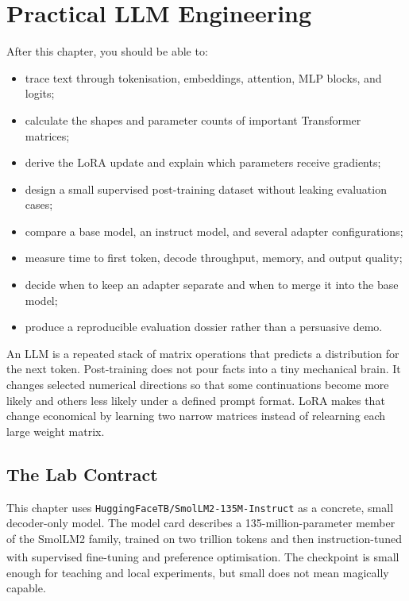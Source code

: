 \chapter{Practical LLM Engineering}
\label{ch:practical-llm-engineering}

\begin{learningobjectives}
After this chapter, you should be able to:
\begin{itemize}
    \item trace text through tokenisation, embeddings, attention, MLP blocks,
          and logits;
    \item calculate the shapes and parameter counts of important Transformer
          matrices;
    \item derive the LoRA update and explain which parameters receive gradients;
    \item design a small supervised post-training dataset without leaking
          evaluation cases;
    \item compare a base model, an instruct model, and several adapter
          configurations;
    \item measure time to first token, decode throughput, memory, and output
          quality;
    \item decide when to keep an adapter separate and when to merge it into the
          base model;
    \item produce a reproducible evaluation dossier rather than a persuasive
          demo.
\end{itemize}
\end{learningobjectives}

\begin{plainlanguage}
An LLM is a repeated stack of matrix operations that predicts a distribution
for the next token.
Post-training does not pour facts into a tiny mechanical brain.
It changes selected numerical directions so that some continuations become
more likely and others less likely under a defined prompt format.
LoRA makes that change economical by learning two narrow matrices instead of
relearning each large weight matrix.
\end{plainlanguage}

\section{The Lab Contract}

This chapter uses \texttt{HuggingFaceTB/SmolLM2-135M-Instruct} as a concrete,
small decoder-only model.
The model card describes a 135-million-parameter member of the SmolLM2 family,
trained on two trillion tokens and then instruction-tuned with supervised
fine-tuning and preference
optimisation.\textsuperscript{\cite{benallalSmolLM2WhenSmol2025,
huggingfaceSmolLM2135MInstruct2026}}
The checkpoint is small enough for teaching and local experiments, but small
does not mean magically capable.

